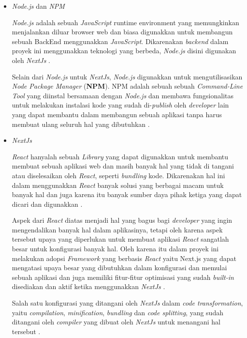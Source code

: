 \documentclass[a4paper]{article}
\begin{document}
\begin{enumerate}[label=\alph*. ]
\begin{enumerate}
\begin{itemize}
                        \item \textit{Node.js} dan \textit{NPM}

                        \textit{Node.js} adalah sebuah \textit{JavaScript} runtime environment yang memungkinkan menjalankan diluar browser web dan biasa digunakkan untuk membangun sebuah BackEnd menggunakkan \textit{JavaScript}. Dikarenakan \textit{backend} dalam proyek ini menggunakkan teknologi yang berbeda, \textit{Node.js} disini digunakan oleh \textit{NextJs} \autocite{Nextjs_use_webpack}.

	                    Selain dari \textit{Node.js} untuk \textit{NextJs}, \textit{Node.js} digunakkan untuk mengutilisasikan \textit{Node Package Manager} (\textbf{NPM}). NPM adalah sebuah sebuah \textit{Command-Line Tool} yang diinstal bersamaan dengan \textit{Node.js} dan membawa fungsionalitas untuk melakukan instalasi kode yang sudah di-\textit{publish} oleh \textit{developer} lain yang dapat membantu dalam membangun sebuah aplikasi tanpa harus membuat ulang seluruh hal yang dibutuhkan \autocite{Banks_Porcello_2020_npm}.

                        \item \textit{NextJs}

                        \textit{React} hanyalah sebuah \textit{Library} yang dapat digunakkan untuk membantu membuat sebuah aplikasi web dan masih banyak hal yang tidak di tangani atau diselesaikan oleh \textit{React}, seperti \textit{bundling} kode. Dikarenakan hal ini dalam menggunakkan \textit{React} banyak solusi yang berbagai macam untuk banyak hal dan juga karena itu banyak sumber daya pihak ketiga yang dapat dicari dan digunakkan \autocite{Nextjs_general}.

	                    Aspek dari \textit{React} diatas menjadi hal yang bagus bagi \textit{developer} yang ingin mengendalikan banyak hal dalam aplikasinya, tetapi oleh karena aspek tersebut upaya yang diperlukan untuk membuat aplikasi \textit{React} sangatlah besar untuk konfigurasi banyak hal. Oleh karena itu dalam proyek ini melakukan adopsi \textit{Framework} yang berbasis \textit{React} yaitu Next.js yang dapat mengatasi upaya besar yang dibutuhkan dalam konfigurasi dan memulai sebuah aplikasi dan juga memiliki fitur-fitur optimisasi yang sudah \textit{built-in} disediakan dan aktif ketika menggunakkan \textit{NextJs} \autocite{Nextjs_general}.

	                    Salah satu konfigurasi yang ditangani oleh \textit{NextJs} dalam \textit{code transformation}, yaitu \textit{compilation}, \textit{minification}, \textit{bundling} dan \textit{code splitting}, yang sudah ditangani oleh \textit{compiler} yang dibuat oleh \textit{NextJs} untuk menangani hal tersebut \autocite{Nextjs_compiler}.


\end{itemize}
\end{enumerate}
\end{enumerate}
\end{document}
